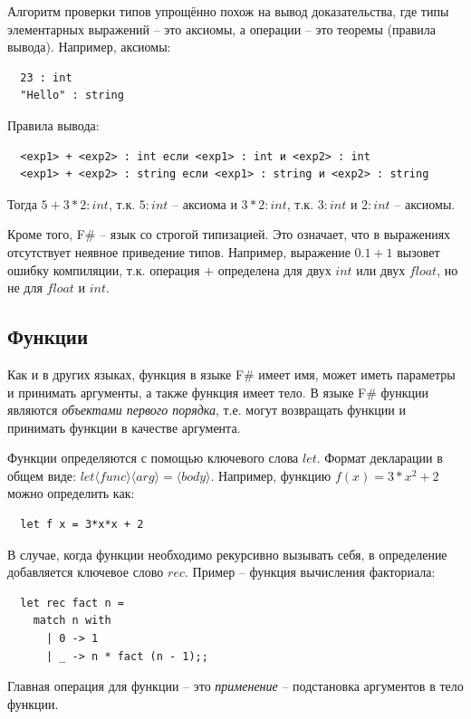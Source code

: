 \documentclass[a4paper,11pt]{article}
\begin{document}
Алгоритм проверки типов упрощённо похож на вывод доказательства, где типы
элементарных выражений -- это аксиомы, а операции -- это теоремы (правила 
вывода). Например, аксиомы:
\begin{lstlisting}
  23 : int
  "Hello" : string
\end{lstlisting}

Правила вывода:

\begin{lstlisting}
  <exp1> + <exp2> : int если <exp1> : int и <exp2> : int
  <exp1> + <exp2> : string если <exp1> : string и <exp2> : string
\end{lstlisting}

Тогда $5 + 3 * 2 : int$, т.к. $5 : int$ -- аксиома и $3 * 2 : int$, т.к.
$3 : int$ и $2 : int$ -- аксиомы.

Кроме того, F\# -- язык со строгой типизацией. Это означает, что в выражениях
отсутствует неявное приведение типов. Например, выражение $0.1 + 1$ вызовет
ошибку компиляции, т.к. операция $+$ определена для двух $int$ или двух $float$, но
не для $float$ и $int$.

\subsection{Функции}

Как и в других языках, функция в языке F\# имеет имя, может иметь параметры и 
принимать аргументы, а также функция имеет тело. В языке F\# функции являются
\emph{объектами первого порядка}, т.е. могут возвращать функции и принимать
функции в качестве аргумента.

Функции определяются с помощью ключевого слова $let$. Формат декларации в
общем виде: $let \langle func \rangle \langle arg \rangle = \langle body
\rangle$. Например, функцию $f(x) = 3*x^2 + 2$
можно определить как:
\begin{lstlisting}
  let f x = 3*x*x + 2
\end{lstlisting}

В случае, когда функции необходимо рекурсивно вызывать себя, в определение
добавляется ключевое слово $rec$. Пример -- функция вычисления факториала:
\begin{lstlisting}
  let rec fact n =
    match n with
      | 0 -> 1
      | _ -> n * fact (n - 1);;
\end{lstlisting}

Главная операция для функции -- это \emph{применение} -- подстановка аргументов
в тело функции.
\end{document}
